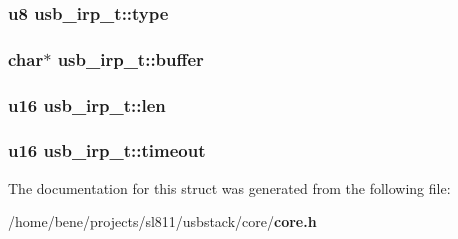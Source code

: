 \subsubsection{\setlength{\rightskip}{0pt plus 5cm}u8 {\bf usb\_\-irp\_\-t::type}}\label{structusb__irp__t_40eeb6df05363ca42df0226cff9c9ea7}


\subsubsection{\setlength{\rightskip}{0pt plus 5cm}char$\ast$ {\bf usb\_\-irp\_\-t::buffer}}\label{structusb__irp__t_172d9bee644d4b4a226edadc0e30717e}


\subsubsection{\setlength{\rightskip}{0pt plus 5cm}u16 {\bf usb\_\-irp\_\-t::len}}\label{structusb__irp__t_fa4f6365a38811223b2df1feb172f296}


\subsubsection{\setlength{\rightskip}{0pt plus 5cm}u16 {\bf usb\_\-irp\_\-t::timeout}}\label{structusb__irp__t_bb74e369de490438f0e682fd62940ab7}




The documentation for this struct was generated from the following file:\begin{CompactItemize}
\item 
/home/bene/projects/sl811/usbstack/core/{\bf core.h}\end{CompactItemize}
